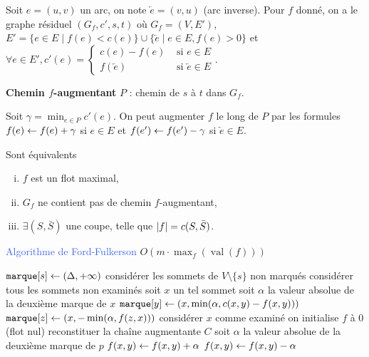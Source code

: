 \documentclass[a4paper,10pt,twocolumn]{article}
\DeclareMathOperator{\val}{val}
\begin{document}
	\begin{note}
	Soit $e = (u,v)$ un arc, on note $\overleftarrow{e} = (v,u)$ (arc inverse).
	Pour $f$ donné, on a le graphe résiduel $(G_f,c',s,t)$ où $G_f = (V,E')$, $E' = \{ e \in E \mid f(e) < c(e) \} \cup \{ \overleftarrow{e} \mid e \in E, f(e) > 0 \}$ et $\forall e \in E', c'(e) = \left\{ \begin{array}{cl}
		c(e) - f(e) & \text{ si } e \in E \\
		f(\overleftarrow{e}) & \text{ si } \overleftarrow{e} \in E
	\end{array}\right.$.
	\end{note}

	\begin{defn}
	\textbf{Chemin $f$-augmentant} $P$ : chemin de $s$ à $t$ dans $G_f$.
	\end{defn}

	Soit $\gamma = \min_{e \in P} c'(e)$.
	On peut augmenter $f$ le long de $P$ par les formules $f(e) \leftarrow f(e) + \gamma$ si $e \in E$ et $f(e') \leftarrow f(e') - \gamma$ si $\overleftarrow{e} \in E$.

	\begin{thm}
	Sont équivalents
		\begin{enumerate}[i.]
		\item $f$ est un flot maximal,
		\item $G_f$ ne contient pas de chemin $f$-augmentant,
		\item $\exists (S,\bar{S})$ une coupe, telle que $\left\lvert f\right\rvert = c(S,\bar{S})$.
		\end{enumerate}
	\end{thm}


	\begin{algorithm}
	\caption{\textcolor{RoyalBlue}{Algorithme de Ford-Fulkerson} $O(m \cdot \max_f(\val(f)))$}
	\func{\rca{}}
	{
		$\texttt{marque}[s] \leftarrow (\Delta,+\infty)$ \;
		considérer les sommets de $V \setminus \{ s \}$ non marqués \;
		considérer tous les sommets non examinés \;
		{
			soit $x$ un tel sommet \;
			soit $\alpha$ la valeur absolue de la deuxième marque de $x$\;
			{
					{$\texttt{marque}[y] \leftarrow (x,\min(\alpha,c(x,y) - f(x,y)))$ \;}
			}
			{
					{$\texttt{marque}[z] \leftarrow (x,-\min(\alpha,f(z,x)))$\;}
			}
			considérer $x$ comme examiné \;
		}
	}
	on initialise $f$ à $0$ (flot nul) \;
	\rca{} \;
	{
		reconstituer la chaîne augmentante $C$ \;
		soit $\alpha$ la valeur absolue de la deuxième marque de $p$\;
		{
			$f(x,y) \leftarrow f(x,y) + \alpha$ \;
		}
		{
			$f(x,y) \leftarrow f(x,y) - \alpha$ \;
		}
		\rca{} \;
	}
	\end{algorithm}
\end{document}
